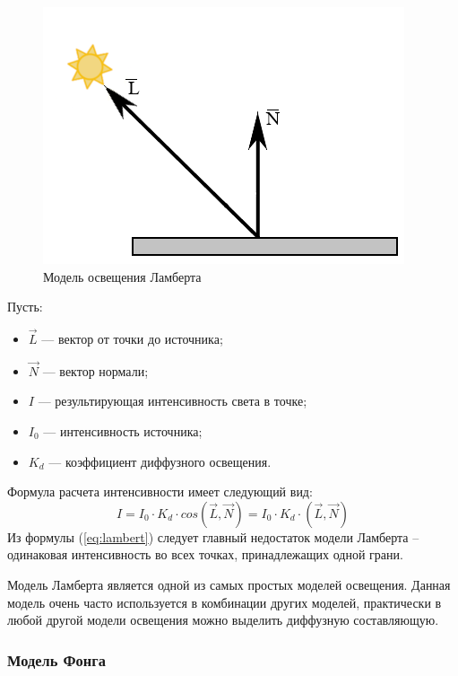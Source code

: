 \begin{figure}[h]
	\centering
	\includegraphics[height=0.3\textheight]{img/lambert.png}
	\caption{Модель освещения Ламберта}
	\label{img:lambert}
\end{figure}

Пусть:
\begin{itemize}
	\item $\overrightarrow L$ --- вектор от точки до источника;
	\item $\overrightarrow N$ --- вектор нормали;
	\item $I$ --- результирующая интенсивность света в точке;
	\item $I_0$ --- интенсивность источника;
	\item $K_d$ --- коэффициент диффузного освещения.
\end{itemize}

Формула расчета интенсивности имеет следующий вид:
\begin{equation}
	\label{eq:lambert}
	I = I_0 \cdot K_d \cdot cos(\overrightarrow L, \overrightarrow N) = I_0 \cdot K_d \cdot (\overrightarrow L, \overrightarrow N) 
\end{equation}
Из формулы (\ref{eq:lambert}) следует главный недостаток модели Ламберта – одинаковая интенсивность во всех точках, принадлежащих одной грани.

Модель Ламберта является одной из самых простых моделей освещения. Данная модель очень часто используется в комбинации других моделей, практически в любой другой модели освещения можно выделить диффузную составляющую.

\subsubsection{Модель Фонга}

